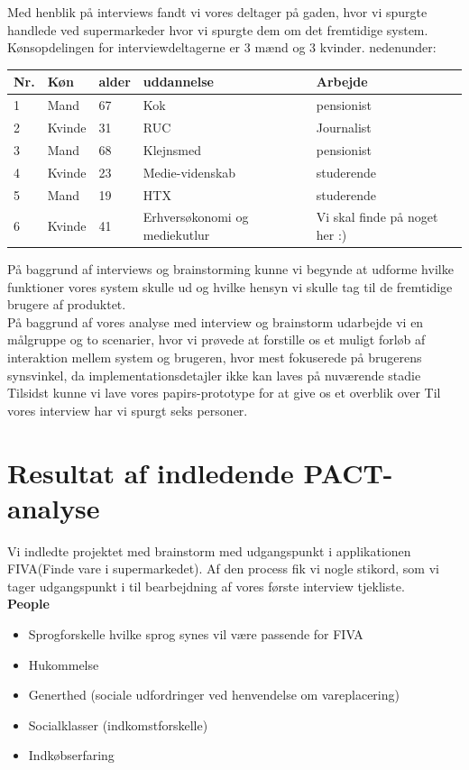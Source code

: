 \documentclass[12pt]{article}
\begin{document}
Med henblik på interviews fandt vi vores deltager på gaden, hvor vi spurgte handlede ved supermarkeder hvor vi spurgte dem om det fremtidige system.\\
Kønsopdelingen for interviewdeltagerne er 3 mænd og 3 kvinder. nedenunder:
\begin{center}
    \begin{tabular}{ |l | l | l | l | l |}
    \hline
    \textbf{Nr.} & \textbf{Køn} & \textbf{alder} & \textbf{uddannelse} & \textbf{Arbejde}\\ \hline
    1 & Mand & 67 & Kok & pensionist \\ \hline
    2 & Kvinde & 31 & RUC & Journalist \\ \hline
    3 & Mand & 68 & Klejnsmed & pensionist \\ \hline
    4 & Kvinde & 23 & Medie-videnskab & studerende \\ \hline
    5 & Mand & 19 & HTX & studerende \\ \hline
    6 & Kvinde & 41 & Erhversøkonomi og mediekutlur & Vi skal finde på noget her :) \\ \hline
     \end{tabular}
\end{center}
På baggrund af interviews og brainstorming kunne vi begynde at udforme hvilke funktioner vores system skulle ud og hvilke hensyn vi skulle tag til de fremtidige brugere af produktet.\\
På baggrund af vores analyse med interview og brainstorm udarbejde vi en målgruppe og to scenarier, hvor vi prøvede at forstille os et muligt forløb af interaktion mellem system og brugeren, hvor mest fokuserede på brugerens synsvinkel, da implementationsdetajler ikke kan laves på nuværende stadie\\
Tilsidst kunne vi lave vores papirs-prototype for at give os et overblik over
Til vores interview har vi spurgt seks personer. 
\newpage
\section{Resultat af indledende PACT-analyse}
Vi indledte projektet med brainstorm med udgangspunkt i applikationen FIVA(Finde vare i supermarkedet). Af den process fik vi nogle stikord, som vi tager udgangspunkt i til bearbejdning af vores første interview tjekliste.\\
 
\noindent \textbf{People}
\begin{itemize} 
\item Sprogforskelle hvilke sprog synes vil være passende for FIVA
\item Hukommelse 
\item Generthed (sociale udfordringer ved henvendelse om vareplacering)
\item Socialklasser (indkomstforskelle)
\item Indkøbserfaring\\
\end{itemize}
\end{document}
